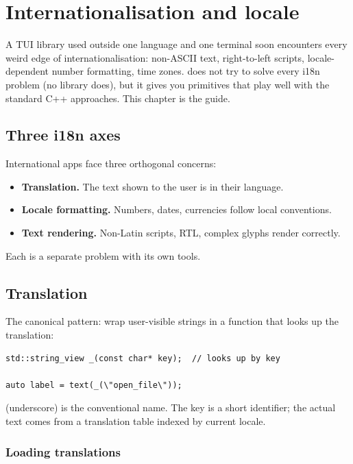\chapter{Internationalisation and locale}
\label{ch:i18n}

\begin{aside}
A TUI library used outside one language and one terminal soon
encounters every weird edge of internationalisation: non-ASCII
text, right-to-left scripts, locale-dependent number
formatting, time zones. \maya{} does not try to solve every i18n
problem (no library does), but it gives you primitives that
play well with the standard C++ approaches. This chapter is the
guide.
\end{aside}

\section{Three i18n axes}

International apps face three orthogonal concerns:

\begin{itemize}[leftmargin=*]
  \item \textbf{Translation.} The text shown to the user is in
    their language.
  \item \textbf{Locale formatting.} Numbers, dates, currencies
    follow local conventions.
  \item \textbf{Text rendering.} Non-Latin scripts, RTL, complex
    glyphs render correctly.
\end{itemize}

Each is a separate problem with its own tools.

\section{Translation}

The canonical pattern: wrap user-visible strings in a function
that looks up the translation:

\begin{lstlisting}
std::string_view _(const char* key);  // looks up by key

auto label = text(_(\"open_file\"));
\end{lstlisting}

\code{\_} (underscore) is the conventional name. The key is a
short identifier; the actual text comes from a translation
table indexed by current locale.

\subsection*{Loading translations}

